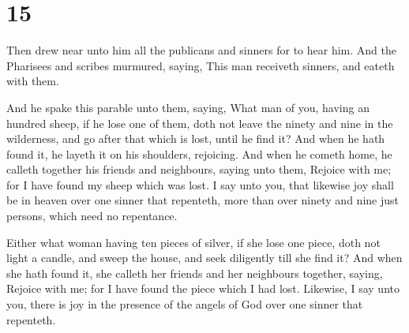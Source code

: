 \hypertarget{section-14}{%
\section{15}\label{section-14}}

 Then drew near unto him all the publicans and sinners for
to hear him.  And the Pharisees and scribes murmured,
saying, This man receiveth sinners, and eateth with them.

 And he spake this parable unto them, saying, 
What man of you, having an hundred sheep, if he lose one of them, doth
not leave the ninety and nine in the wilderness, and go after that which
is lost, until he find it?  And when he hath found it, he
layeth it on his shoulders, rejoicing.  And when he cometh
home, he calleth together his friends and neighbours, saying unto them,
Rejoice with me; for I have found my sheep which was lost. 
I say unto you, that likewise joy shall be in heaven over one sinner
that repenteth, more than over ninety and nine just persons, which need
no repentance.

 Either what woman having ten pieces of silver, if she
lose one piece, doth not light a candle, and sweep the house, and seek
diligently till she find it?  And when she hath found it,
she calleth her friends and her neighbours together, saying, Rejoice
with me; for I have found the piece which I had lost. 
Likewise, I say unto you, there is joy in the presence of the angels of
God over one sinner that repenteth.

